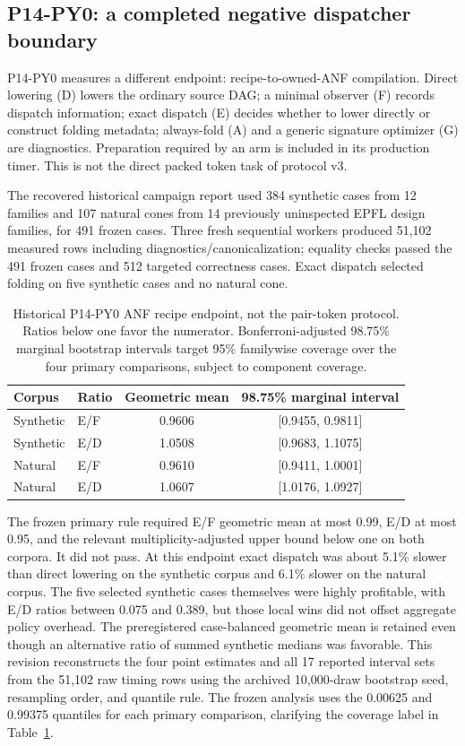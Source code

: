 \documentclass[10pt]{article}
\theoremstyle{plain}
\theoremstyle{definition}
\theoremstyle{remark}
\begin{document}
\subsection{P14-PY0: a completed negative dispatcher boundary}

P14-PY0 measures a different endpoint: recipe-to-owned-ANF compilation. Direct lowering (D) lowers the ordinary source DAG; a minimal observer (F) records dispatch information; exact dispatch (E) decides whether to lower directly or construct folding metadata; always-fold (A) and a generic signature optimizer (G) are diagnostics. Preparation required by an arm is included in its production timer. This is not the direct packed token task of protocol v3.

The recovered historical campaign report used 384 synthetic cases from 12 families and 107 natural cones from 14 previously uninspected EPFL design families, for 491 frozen cases. Three fresh sequential workers produced 51,102 measured rows including diagnostics/canonicalization; equality checks passed the 491 frozen cases and 512 targeted correctness cases. Exact dispatch selected folding on five synthetic cases and no natural cone.

\begin{table}[H]
\centering
\small
\begin{tabular}{@{}llcc@{}}
\toprule
\textbf{Corpus} & \textbf{Ratio} & \textbf{Geometric mean} & \textbf{98.75\% marginal interval}\\
\midrule
Synthetic & E/F & 0.9606 & [0.9455, 0.9811]\\
Synthetic & E/D & 1.0508 & [0.9683, 1.1075]\\
Natural & E/F & 0.9610 & [0.9411, 1.0001]\\
Natural & E/D & 1.0607 & [1.0176, 1.0927]\\
\bottomrule
\end{tabular}
\caption{Historical P14-PY0 ANF recipe endpoint, not the pair-token protocol. Ratios below one favor the numerator. Bonferroni-adjusted 98.75\% marginal bootstrap intervals target 95\% familywise coverage over the four primary comparisons, subject to component coverage.}
\label{tab:p14}
\end{table}

The frozen primary rule required E/F geometric mean at most 0.99, E/D at most 0.95, and the relevant multiplicity-adjusted upper bound below one on both corpora. It did not pass. At this endpoint exact dispatch was about 5.1\% slower than direct lowering on the synthetic corpus and 6.1\% slower on the natural corpus. The five selected synthetic cases themselves were highly profitable, with E/D ratios between 0.075 and 0.389, but those local wins did not offset aggregate policy overhead. The preregistered case-balanced geometric mean is retained even though an alternative ratio of summed synthetic medians was favorable. This revision reconstructs the four point estimates and all 17 reported interval sets from the 51,102 raw timing rows using the archived 10,000-draw bootstrap seed, resampling order, and quantile rule. The frozen analysis uses the 0.00625 and 0.99375 quantiles for each primary comparison, clarifying the coverage label in Table~\ref{tab:p14}.
\end{document}
